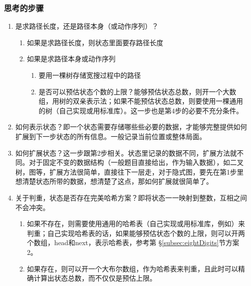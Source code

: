 \subsubsection{思考的步骤}
\begin{enumerate}
\item 是求路径长度，还是路径本身（或动作序列）？
    \begin{enumerate}
    \item 如果是求路径长度，则状态里面要存路径长度
    \item 如果是求路径本身或动作序列
        \begin{enumerate}
            \item 要用一棵树存储宽搜过程中的路径
            \item 是否可以预估状态个数的上限？能够预估状态总数，则开一个大数组，用树的双亲表示法；如果不能预估状态总数，则要使用一棵通用的树（自己实现或用标准库）。这一步也是第4步的必要不充分条件。
        \end{enumerate}
    \end{enumerate}
\item 如何表示状态？即一个状态需要存储哪些些必要的数据，才能够完整提供如何扩展到下一步状态的所有信息。一般记录当前位置或整体局面。
\item 如何扩展状态？这一步跟第2步相关。状态里记录的数据不同，扩展方法就不同。对于固定不变的数据结构（一般题目直接给出，作为输入数据），如二叉树，图等，扩展方法很简单，直接往下一层走，对于隐式图，要先在第1步里想清楚状态所带的数据，想清楚了这点，那如何扩展就很简单了。
\item 关于判重，状态是否存在完美哈希方案？即将状态一一映射到整数，互相之间不会冲突。
    \begin{enumerate}
    \item 如果不存在，则需要使用通用的哈希表（自己实现或用标准库，例如）来判重；自己实现哈希表的话，如果能够预估状态个数的上限，则可以开两个数组，head和next，表示哈希表，参考第 \S \ref{subsec:eightDigits}节方案2。
    \item 如果存在，则可以开一个大布尔数组，作为哈希表来判重，且此时可以精确计算出状态总数，而不仅仅是预估上限。
    \end{enumerate}
\end{enumerate}


